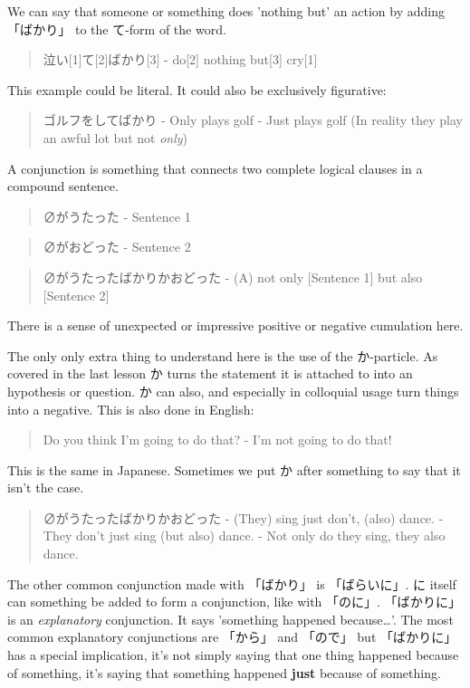 \documentclass[11pt]{article}
\begin{document}
We can say that someone or something does 'nothing but' an action by adding 「ばかり」 to the て-form of the word.
\begin{quote}
泣い[1]て[2]ばかり[3] - do[2] nothing but[3] cry[1]
\end{quote}
This example could be literal. It could also be exclusively figurative:
\begin{quote}
ゴルフをしてばかり - Only plays golf - Just plays golf (In reality they play an awful lot but not \emph{only})
\end{quote}

A conjunction is something that connects two complete logical clauses in a compound sentence.
\begin{quote}
∅がうたった - Sentence 1
\end{quote}
\begin{quote}
∅がおどった - Sentence 2
\end{quote}
\begin{quote}
∅がうたったばかりかおどった - (A) not only [Sentence 1] but also [Sentence 2]
\end{quote}
There is a sense of unexpected or impressive positive or negative cumulation here.

The only only extra thing to understand here is the use of the か-particle. As covered in the last lesson か turns the statement it is attached to into an hypothesis or question. か can also, and especially in colloquial usage turn things into a negative. This is also done in English:
\begin{quote}
Do you think I'm going to do that? - I'm not going to do that!
\end{quote}
This is the same in Japanese. Sometimes we put か after something to say that it isn't the case.
\begin{quote}
∅がうたったばかりかおどった - (They) sing just don't, (also) dance. - They don't just sing (but also) dance. - Not only do they sing, they also dance.
\end{quote}

The other common conjunction made with 「ばかり」 is 「ばらいに」. に itself can something be added to form a conjunction, like with 「のに」. 「ばかりに」 is an \emph{explanatory} conjunction. It says 'something happened because\ldots{}'. The most common explanatory conjunctions are 「から」 and 「ので」 but 「ばかりに」 has a special implication, it's not simply saying that one thing happened because of something, it's saying that something happened \textbf{just} because of something.
\end{document}

